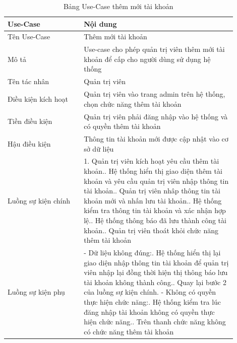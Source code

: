 \begin{longtable}[htp]{ |m{0.3\linewidth}|m{0.6\linewidth}|}
 \caption{Bảng Use-Case thêm mới tài khoản \label{long}}\\
 \hline
 Use-Case & Nội dung \\
 \hline
 Tên Use-Case & Thêm mới tài khoản \\
 \hline
 Mô tả & Use-case cho phép quản trị viên thêm mới tài khoản để cấp cho người dùng sử dụng hệ thống\\
 \hline
 Tên tác nhân & Quản trị viên\\
 \hline
 Điều kiện kích hoạt & Quản trị viên vào trang admin trên hệ thống, chọn chức năng thêm tài khoản\\
 \hline
 Tiền điều kiện & Quản trị viên phải đăng nhập vào hệ thống và có quyền thêm tài khoản\\
 \hline
 Hậu điều kiện & Thông tin tài khoản mới được cập nhật vào cơ sở dữ liệu\\
 \hline
 Luồng sự kiện chính & 
 1. Quản trị viên kích hoạt yêu cầu thêm tài khoản.\newline
 2. Hệ thống hiển thị giao diện thêm tài khoản và yêu cầu quản trị viên nhập thông tin tài khoản.\newline
 3. Quản trị viên nhâp thông tin tài khoản mới và nhấn lưu tài khoản.\newline
 4. Hệ thống kiểm tra thông tin tài khoản và xác nhận hợp lệ.\newline
 5. Hệ thống thông báo đã lưu thành công tài khoản.\newline	
 6. Quản trị viên thoát khỏi chức năng thêm tài khoản
 \\
 \hline
 Luồng sự kiện phụ & 
 - Dữ liệu không đúng:\newline
  1. Hệ thống hiển thị lại giao diện nhập thông tin tài khoản để quản trị viên nhập lại đồng thời hiện thị thông báo lưu tài khoản không thành công.\newline
  2. Quay lại bước 2 của luồng sự kiện chính.\newline
  - Không có quyền thực hiện chức năng:\newline
  1. Hệ thống kiểm tra lúc đăng nhập tài khoản không có quyền thực hiện chức năng.\newline
  2. Trên thanh chức năng không có chức năng thêm tài khoản
 \\
 \hline
\end{longtable}
\newpage

